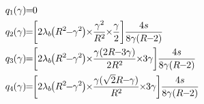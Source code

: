 \documentclass{article}
\begin{document}
\begin{subequations}
\medmuskip=-1mu
\thinmuskip=-1mu
\thickmuskip=-1mu
\scriptspace=0pt
\begin{align}
	q_1(\gamma) &= 0 \\
	q_2(\gamma) &= \left[2 \lambda_b \left(R^2 - \gamma^2\right) \times \frac{\gamma^2}{R^2} \times\frac{\gamma}{2}\right] \frac{4s}{8\gamma (R-2)}\\
	q_3(\gamma) &= \left[2 \lambda_b \left(R^2 - \gamma^2\right) \times \frac{\gamma (2R - 3\gamma)}{2R^2} \times  3\gamma\right] \frac{4s}{8\gamma (R-2)}\\
	q_4(\gamma) &= \left[2 \lambda_b \left(R^2 - \gamma^2\right) \times \frac{\gamma (\sqrt{2}R-\gamma)}{R^2} \times  3\gamma\right] \frac{4s}{8\gamma (R-2)}
\end{align}
\end{subequations}
\end{document}
